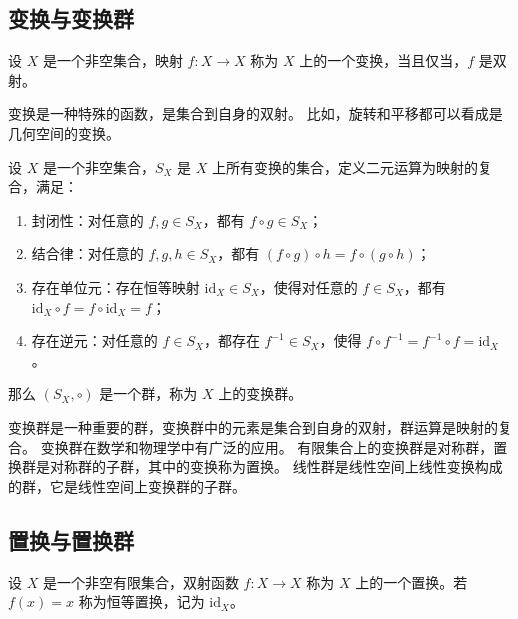 \subsection{变换与变换群}
\begin{definition}[变换 Transformation]
    设 $X$ 是一个非空集合，映射 $f: X \to X$ 称为 $X$ 上的一个变换，当且仅当，$f$ 是双射。
\end{definition}
\begin{note}
    变换是一种特殊的函数，是集合到自身的双射。
    比如，旋转和平移都可以看成是几何空间的变换。
\end{note}
\vspace{1em}

\begin{definition}
    设 $X$ 是一个非空集合，$S_X$ 是 $X$ 上所有变换的集合，定义二元运算为映射的复合，满足：
    \begin{enumerate}
        \item 封闭性：对任意的 $f, g\in S_X$，都有 $f \circ g \in S_X$；
        \item 结合律：对任意的 $f, g, h\in S_X$，都有 $(f \circ g) \circ h = f \circ (g \circ h)$；
        \item 存在单位元：存在恒等映射 $\mathrm{id}_X\in S_X$，使得对任意的 $f\in S_X$，都有 $\mathrm{id}_X \circ f = f \circ \mathrm{id}_X = f$；
        \item 存在逆元：对任意的 $f\in S_X$，都存在 $f^{-1}\in S_X$，使得 $f \circ f^{-1} = f^{-1} \circ f = \mathrm{id}_X$。
    \end{enumerate}    
    那么 $(S_X, \circ)$ 是一个群，称为 $X$ 上的变换群。
\end{definition}

\begin{note}
    变换群是一种重要的群，变换群中的元素是集合到自身的双射，群运算是映射的复合。
    变换群在数学和物理学中有广泛的应用。
    有限集合上的变换群是对称群，置换群是对称群的子群，其中的变换称为置换。
    线性群是线性空间上线性变换构成的群，它是线性空间上变换群的子群。
\end{note}
\vspace{1em}

\vspace{1em}
\subsection{置换与置换群}
\begin{definition}[置换 Permutation]
    设 $X$ 是一个非空有限集合，双射函数 $f: X \to X$ 称为 $X$ 上的一个置换。若 $f(x)=x$ 称为恒等置换，记为 $\mathrm{id}_X$。
\end{definition}


